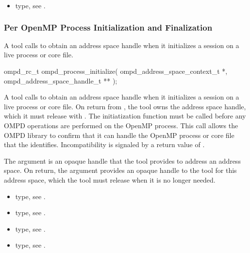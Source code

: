 \crossreferences
\begin{itemize}
\item {} type, see .
\end{itemize}



\subsubsection{Per OpenMP Process Initialization and Finalization}



\label{subsubsubsec:ompd_process_initialize}
\summary
A tool calls  to obtain an address space 
handle when it initializes a session on a live process or core file.

\format
\begin{cspecific}
\begin{ompSyntax}
ompd_rc_t ompd_process_initialize(
  ompd_address_space_context_t *,
  ompd_address_space_handle_t **
);
\end{ompSyntax}
\end{cspecific}

\descr
A tool calls  to obtain an address space 
handle when it initializes a session on a live process or core file.
On return from , the tool owns the address
space handle, which it must release with .
The initiatization function must be called before any OMPD operations
are performed on the OpenMP process. This call allows the OMPD library 
to confirm that it can handle the OpenMP process or core file that the 
 identifies. Incompatibility is signaled by a 
return value of . 

\argdesc
The  argument is an opaque handle that the tool provides to 
address an address space. On return, the  argument provides 
an opaque handle to the tool for this address space, which the tool must
release when it is no longer needed.

\crossreferences
\begin{itemize}
\item {} type, 
see .

\item {} type, 
see .

\item {} type, see .

\item {} type, 
see .
\end{itemize}



